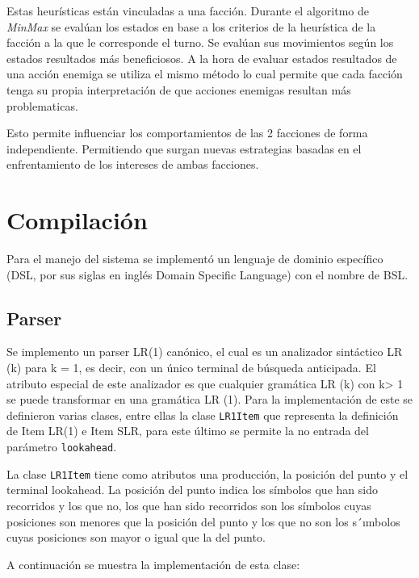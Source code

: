 \documentclass[twoside]{article}
\begin{document}
		Estas heur\'isticas est\'an vinculadas a una facci\'on. Durante el algoritmo de \emph{MinMax} se eval\'uan los estados en base a los criterios de la heur\'istica de la facci\'on a la que le corresponde el turno. Se eval\'uan sus movimientos seg\'un los estados resultados m\'as beneficiosos. A la hora de evaluar estados resultados de una acci\'on enemiga se utiliza el mismo m\'etodo lo cual permite que cada facci\'on tenga su propia interpretaci\'on de que acciones enemigas resultan m\'as problematicas.
		
		Esto permite influenciar los comportamientos de las 2 facciones de forma independiente. Permitiendo que surgan nuevas estrategias basadas en el enfrentamiento de los intereses de ambas facciones.
		
		\section{Compilaci\'on}
		Para el manejo del sistema se implement\'o un lenguaje de dominio espec\'ifico (DSL, por sus siglas en ingl\'es Domain Specific Language) con el nombre de BSL. 
		
		\subsection{Parser}
		Se implemento un parser LR(1) can\'onico, el cual es un analizador sintáctico LR (k) para k = 1, es decir, con un único terminal de búsqueda anticipada. El atributo especial de este analizador es que cualquier gramática LR (k) con k> 1 se puede transformar en una gramática LR (1).
		Para la implementaci\'on de este se definieron varias clases, entre ellas la clase  \texttt{LR1Item} que representa la definici\'on de Item LR(1) e Item SLR, para este \'ultimo se permite la no entrada del par\'ametro \texttt{lookahead}.
		
		La clase \texttt{LR1Item} tiene como atributos una producci\'on, la posici\'on del punto y el terminal lookahead. La posici\'on del punto indica los s\'imbolos que han sido recorridos y los que no, los que han sido recorridos son los s\'imbolos cuyas posiciones son menores que la posici\'on del punto y los que no son los s´ımbolos cuyas posiciones son mayor o igual que la del punto.
		
		A continuaci\'on se muestra la implementaci\'on de esta clase:\\
		
\end{document}

